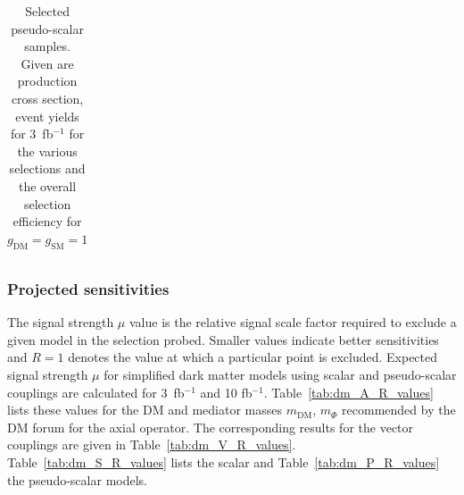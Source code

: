 \begin{table}[h!]
\begin{tabular}{lllllll}
\hline
\end{tabular}
\caption{Selected pseudo-scalar samples. Given are production cross section, event yields for 3~fb$^{-1 }$ for the various selections and the overall selection efficiency for $g_\textrm{DM}=g_\textrm{SM}=1$}
\label{tab:dm_P_g1_3fb}
\end{table}



\subsubsection{Projected sensitivities}

The signal strength $\mu$ value is the relative signal scale factor required to exclude a given model in the selection probed. Smaller values indicate better sensitivities and $R=1$ denotes the value at which a particular point is excluded. Expected signal strength $\mu$ for simplified dark matter models using scalar and pseudo-scalar couplings are calculated for 3~fb$^{-1 }$ and 10 fb$^{-1 }$. Table~\ref{tab:dm_A_R_values} lists these
values for the DM and mediator masses $m_\textrm{DM}$, $m_\Phi$ recommended by the DM forum for the axial operator. The corresponding results for the vector couplings are given in Table~\ref{tab:dm_V_R_values}. Table~\ref{tab:dm_S_R_values} lists the scalar and Table~\ref{tab:dm_P_R_values} the pseudo-scalar models.




